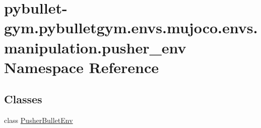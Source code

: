 \hypertarget{namespacepybullet-gym_1_1pybulletgym_1_1envs_1_1mujoco_1_1envs_1_1manipulation_1_1pusher__env}{}\section{pybullet-\/gym.pybulletgym.\+envs.\+mujoco.\+envs.\+manipulation.\+pusher\+\_\+env Namespace Reference}
\label{namespacepybullet-gym_1_1pybulletgym_1_1envs_1_1mujoco_1_1envs_1_1manipulation_1_1pusher__env}
\subsection*{Classes}
\begin{DoxyCompactItemize}
\item 
class \hyperlink{classpybullet-gym_1_1pybulletgym_1_1envs_1_1mujoco_1_1envs_1_1manipulation_1_1pusher__env_1_1_pusher_bullet_env}{Pusher\+Bullet\+Env}
\end{DoxyCompactItemize}
